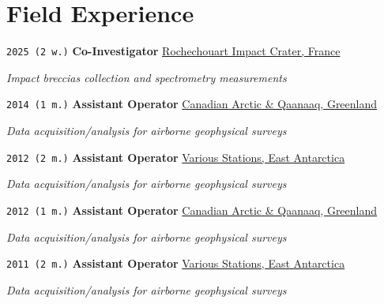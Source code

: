 \section*{Field Experience}

\TabPositions{7em,23em}

\noindent \texttt{2025 (2 w.)} \tab \textbf{Co-Investigator} \tab \href{https://cirir-edu.org/cirir/}{Rochechouart Impact Crater, France}
\begin{adjustwidth}{7em}{}
\textit{Impact breccias collection and spectrometry measurements}
\end{adjustwidth}
\vspace{.5em}

\noindent \texttt{2014 (1 m.)} \tab \textbf{Assistant Operator} \tab \href{https://en.wikipedia.org/wiki/Qaanaaq}{Canadian Arctic \& Qaanaaq, Greenland}
\begin{adjustwidth}{7em}{}
\textit{Data acquisition/analysis for airborne geophysical surveys}
\end{adjustwidth}
\vspace{.5em}

\noindent \texttt{2012 (2 m.)} \tab \textbf{Assistant Operator} \tab \href{https://en.wikipedia.org/wiki/East_Antarctic_Ice_Sheet}{Various Stations, East Antarctica}
\begin{adjustwidth}{7em}{}
\textit{Data acquisition/analysis for airborne geophysical surveys}
\end{adjustwidth}
\vspace{.5em}

\noindent \texttt{2012 (1 m.)} \tab \textbf{Assistant Operator} \tab \href{https://en.wikipedia.org/wiki/Qaanaaq}{Canadian Arctic \& Qaanaaq, Greenland}
\begin{adjustwidth}{7em}{}
\textit{Data acquisition/analysis for airborne geophysical surveys}
\end{adjustwidth}
\vspace{.5em}

\noindent \texttt{2011 (2 m.)} \tab \textbf{Assistant Operator} \tab \href{https://en.wikipedia.org/wiki/East_Antarctic_Ice_Sheet}{Various Stations, East Antarctica}
\begin{adjustwidth}{7em}{}
\textit{Data acquisition/analysis for airborne geophysical surveys}
\end{adjustwidth}